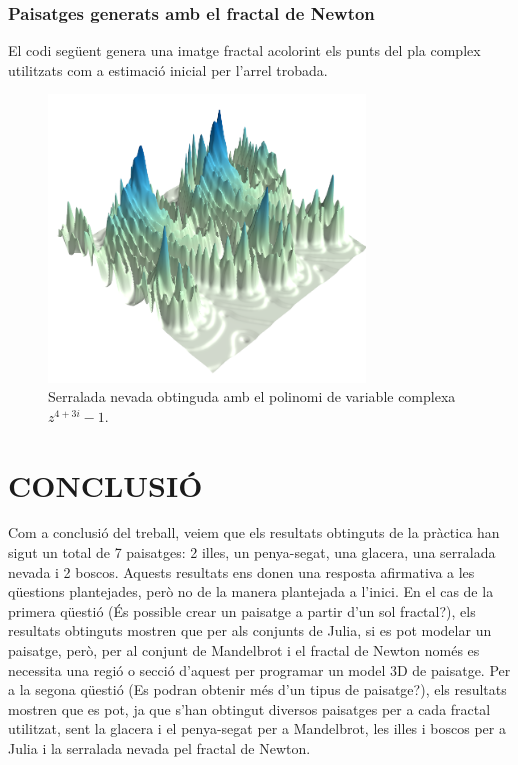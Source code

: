 \documentclass[12pt,a4paper]{report}
\begin{document}
\subsection{Paisatges generats amb el fractal de Newton}
El codi següent genera una imatge fractal acolorint els punts del pla complex utilitzats com a estimació inicial per l'arrel trobada.
{
}
\begin{figure}[!ht]
\centering
\includegraphics[width=0.75\textwidth]{img/newton_mountain.png}
\caption{Serralada nevada obtinguda amb el polinomi de variable complexa $z^{4+3i}-1$.}
\end{figure}

\chapter{CONCLUSIÓ}

Com a conclusió del treball, veiem que els resultats obtinguts de la pràctica han sigut un total de 7 paisatges: 2 illes, un penya-segat, una glacera, una serralada nevada i 2 boscos.  Aquests resultats ens donen una resposta afirmativa a les qüestions plantejades, però no de la manera plantejada a l'inici.  En el cas de la primera qüestió (És possible crear un paisatge a partir d'un sol fractal?), els resultats obtinguts mostren que per als conjunts de Julia, si es pot modelar un paisatge, però, per al conjunt de Mandelbrot i el fractal de Newton només es necessita una regió o secció d’aquest per programar un model 3D de paisatge. Per a la segona qüestió (Es podran obtenir més d’un tipus de paisatge?), els resultats mostren que es pot, ja que s’han obtingut diversos paisatges per a cada fractal utilitzat, sent la glacera i el penya-segat per a Mandelbrot, les illes i boscos per a Julia i la serralada nevada pel fractal de Newton.
\end{document}
